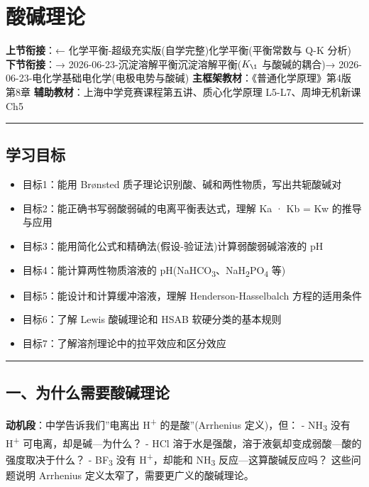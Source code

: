 \section{酸碱理论}\label{ux9178ux78b1ux7406ux8bba}

\textbf{上节衔接}：← 化学平衡-超级充实版(自学完整)\textbar 化学平衡(平衡常数与 Q-K 分析)
\textbf{下节衔接}：→ 2026-06-23-沉淀溶解平衡\textbar 沉淀溶解平衡(\(K_{\1}\) 与酸碱的耦合)→ 2026-06-23-电化学基础\textbar 电化学(电极电势与酸碱)
\textbf{主框架教材}：《普通化学原理》第4版 第8章
\textbf{辅助教材}：上海中学竞赛课程第五讲、质心化学原理 L5-L7、周坤无机新课 Ch5

\begin{center}\rule{0.5\linewidth}{0.5pt}\end{center}

\subsection{学习目标}\label{ux5b66ux4e60ux76eeux6807}

\begin{itemize}
\tightlist
\item
  目标1：能用 Brønsted 质子理论识别酸、碱和两性物质，写出共轭酸碱对
\item
  目标2：能正确书写弱酸弱碱的电离平衡表达式，理解 Ka · Kb = Kw 的推导与应用
\item
  目标3：能用简化公式和精确法(假设-验证法)计算弱酸弱碱溶液的 pH
\item
  目标4：能计算两性物质溶液的 pH(NaHCO\textsubscript{3}、NaH\textsubscript{2}PO\textsubscript{4} 等)
\item
  目标5：能设计和计算缓冲溶液，理解 Henderson-Hasselbalch 方程的适用条件
\item
  目标6：了解 Lewis 酸碱理论和 HSAB 软硬分类的基本规则
\item
  目标7：了解溶剂理论中的拉平效应和区分效应
\end{itemize}

\begin{center}\rule{0.5\linewidth}{0.5pt}\end{center}

\subsection{一、为什么需要酸碱理论}\label{ux4e00ux4e3aux4ec0ux4e48ux9700ux8981ux9178ux78b1ux7406ux8bba}

\textbf{动机段}：中学告诉我们''电离出 H\textsuperscript{+} 的是酸''(Arrhenius 定义)，但：
- NH\textsubscript{3} 没有 H\textsuperscript{+} 可电离，却是碱---为什么？
- HCl 溶于水是强酸，溶于液氨却变成弱酸---酸的强度取决于什么？
- BF\textsubscript{3} 没有 H\textsuperscript{+}，却能和 NH\textsubscript{3} 反应---这算酸碱反应吗？
这些问题说明 Arrhenius 定义太窄了，需要更广义的酸碱理论。

